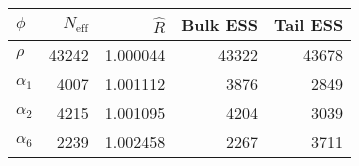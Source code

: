 \begin{table}[!th]
\centering
\begin{tabular}{>{\raggedright\arraybackslash}p{1cm}rrrr}
\toprule
$\phi$ & $N_{\text{eff}}$ & $\widehat{R}$ & Bulk ESS & Tail ESS\\
\midrule
\rowcolor{gray!6}  $\rho$ & 43242 & 1.000044 & 43322 & 43678\\
$\alpha_{1}$ & 4007 & 1.001112 & 3876 & 2849\\
\rowcolor{gray!6}  $\alpha_{2}$ & 4215 & 1.001095 & 4204 & 3039\\
$\alpha_{6}$ & 2239 & 1.002458 & 2267 & 3711\\
\bottomrule
\end{tabular}
\end{table}